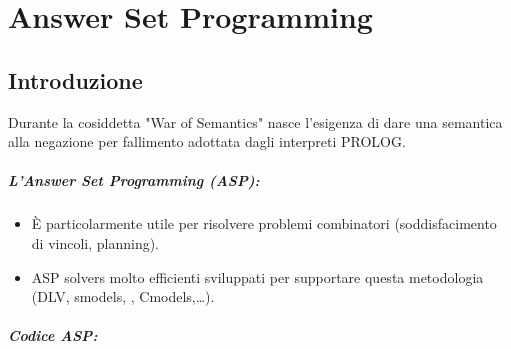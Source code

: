 \chapter{Answer Set Programming}

\section{Introduzione}

Durante la cosiddetta "War of Semantics" nasce l'esigenza di dare una semantica alla negazione per fallimento adottata dagli interpreti PROLOG.



\paragraph{L'Answer Set Programming (ASP):}

\begin{itemize}
  \item È particolarmente utile per risolvere problemi combinatori (soddisfacimento di vincoli, planning).
  \item ASP solvers molto efficienti sviluppati per supportare questa metodologia (DLV, smodels, , Cmodels,\dots).
\end{itemize}


\paragraph{Codice ASP:}

